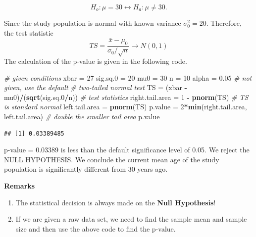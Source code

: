 \documentclass[
]{book}
\newenvironment{Shaded}{\begin{snugshade}}{\end{snugshade}}
\newcommand{\CommentTok}[1]{\textcolor[rgb]{0.56,0.35,0.01}{\textit{#1}}}
\newcommand{\DecValTok}[1]{\textcolor[rgb]{0.00,0.00,0.81}{#1}}
\newcommand{\FloatTok}[1]{\textcolor[rgb]{0.00,0.00,0.81}{#1}}
\newcommand{\FunctionTok}[1]{\textcolor[rgb]{0.13,0.29,0.53}{\textbf{#1}}}
\newcommand{\NormalTok}[1]{#1}
\newcommand{\OtherTok}[1]{\textcolor[rgb]{0.56,0.35,0.01}{#1}}
\newcommand{\SpecialCharTok}[1]{\textcolor[rgb]{0.81,0.36,0.00}{\textbf{#1}}}
\providecommand{\tightlist}{%
  \setlength{\itemsep}{0pt}\setlength{\parskip}{0pt}}
\begin{document}
\[
H_o: \mu = 30  \leftrightarrow  H_a: \mu \ne 30.
\]

Since the study population is normal with known variance \(\sigma_0^2=20\). Therefore, the test statistic
\[
TS = \frac{\bar{x} - \mu_0}{\sigma_0/\sqrt{n}} \to N(0,1)
\]
The calculation of the p-value is given in the following code.

\begin{Shaded}
\begin{Highlighting}[]
\CommentTok{\# given conditions}
\NormalTok{xbar }\OtherTok{=} \DecValTok{27}
\NormalTok{sig.sq}\FloatTok{.0} \OtherTok{=} \DecValTok{20}
\NormalTok{mu0 }\OtherTok{=} \DecValTok{30}
\NormalTok{n }\OtherTok{=} \DecValTok{10}
\NormalTok{alpha }\OtherTok{=} \FloatTok{0.05}   \CommentTok{\# not given, use the default}
\CommentTok{\# two{-}tailed normal test}
\NormalTok{TS }\OtherTok{=}\NormalTok{ (xbar }\SpecialCharTok{{-}}\NormalTok{ mu0)}\SpecialCharTok{/}\NormalTok{(}\FunctionTok{sqrt}\NormalTok{(sig.sq}\FloatTok{.0}\SpecialCharTok{/}\NormalTok{n))    }\CommentTok{\# test statistics}
\NormalTok{right.tail.area }\OtherTok{=} \DecValTok{1} \SpecialCharTok{{-}} \FunctionTok{pnorm}\NormalTok{(TS)      }\CommentTok{\# TS is standard normal}
\NormalTok{left.tail.area }\OtherTok{=} \FunctionTok{pnorm}\NormalTok{(TS)           }
\NormalTok{p.value }\OtherTok{=} \DecValTok{2}\SpecialCharTok{*}\FunctionTok{min}\NormalTok{(right.tail.area, left.tail.area)   }\CommentTok{\# double the smaller tail area}
\NormalTok{p.value}
\end{Highlighting}
\end{Shaded}

\begin{verbatim}
## [1] 0.03389485
\end{verbatim}

p-value = 0.03389 is less than the default significance level of 0.05. We reject the NULL HYPOTHESIS. We conclude the current mean age of the study population is significantly different from 30 years ago.

\textbf{Remarks}

\begin{enumerate}
\def\labelenumi{\arabic{enumi}.}
\tightlist
\item
  The statistical decision is always made on the \textbf{Null Hypothesis}!
\item
  If we are given a raw data set, we need to find the sample mean and sample size and then use the above code to find the p-value.
\end{enumerate}
\end{document}
